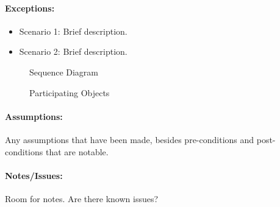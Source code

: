 \paragraph{Exceptions:}
\begin{itemize}
	\item Scenario 1: Brief description.
	\item Scenario 2: Brief description.
\end{itemize}


\begin{figure} [htb]
	\centering
	\caption{Sequence Diagram}
	\label{fig:sequence template}
\end{figure}




\begin{figure} [h]
	\centering
	\caption{Participating Objects}
	\label{fig:objects template}
\end{figure}



\paragraph{Assumptions:}
Any assumptions that have been made, besides pre-conditions and post-conditions that are notable.


\paragraph{Notes/Issues:}
Room for notes. Are there known issues?



